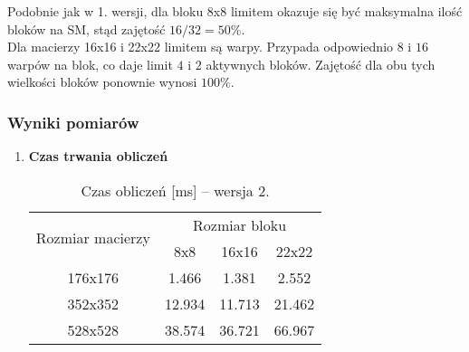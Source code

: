 Podobnie jak w 1. wersji, dla bloku 8x8 limitem okazuje się być maksymalna ilość bloków na SM, stąd zajętość $ 16 / 32 = 50\% $. \\
Dla macierzy 16x16 i 22x22 limitem są warpy. Przypada odpowiednio $ 8 $ i $ 16 $ warpów na blok, co daje limit $ 4 $ i $ 2 $ aktywnych bloków. Zajętość dla obu tych wielkości bloków ponownie wynosi $ 100\% $.

\newpage
\subsubsection{Wyniki pomiarów}

\begin{enumerate}

\item \textbf{Czas trwania obliczeń} \newline

\begin{table}[H]
\centering
\begin{tabular}{|c|c|c|c|}
\hline
\multirow{2}{*}{Rozmiar macierzy} & \multicolumn{3}{c|}{Rozmiar bloku} \\ \cline{2-4}
& 8x8 & 16x16 & 22x22 \\ \hline
176x176 & 1.466 & 1.381 & 2.552 \\ \hline
352x352 & 12.934 & 11.713 & 21.462 \\ \hline
528x528 & 38.574 & 36.721 & 66.967 \\ \hline
\end{tabular}
\caption{Czas obliczeń [ms] -- wersja 2.}
\end{table}

\begin{figure}[H]
\centering
\end{figure}
\end{enumerate}
